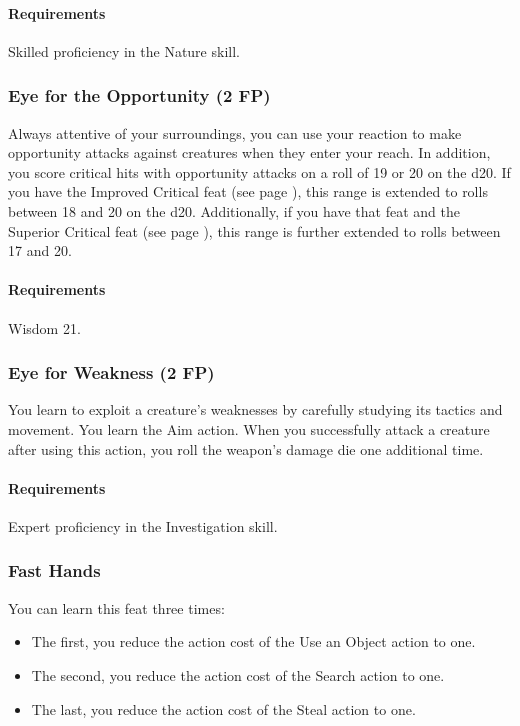     \paragraph{Requirements} Skilled proficiency in the Nature skill.
\subsubsection{Eye for the Opportunity (2 FP)} \label{feat::eyefortheopportunity}
    Always attentive of your surroundings, you can use your reaction to make opportunity attacks against creatures when they enter your reach.
    In addition, you score critical hits with opportunity attacks on a roll of 19 or 20 on the d20.
    If you have the Improved Critical feat (see page \pageref{feat::improvedcritical}), this range is extended to rolls between 18 and 20 on the d20.
    Additionally, if you have that feat and the Superior Critical feat (see page \pageref{feat::superiorcritical}), this range is further extended to rolls between 17 and 20.
    \paragraph{Requirements} Wisdom 21.
\subsubsection{Eye for Weakness (2 FP)} \label{feat::eyeforweakness}
    You learn to exploit a creature's weaknesses by carefully studying its tactics and movement.
    You learn the Aim action.
    When you successfully attack a creature after using this action, you roll the weapon's damage die one additional time.
    \paragraph{Requirements} Expert proficiency in the Investigation skill.
\subsubsection{Fast Hands} \label{feat::fasthands}
    You can learn this feat three times:
    \begin{itemize}
        \item The first, you reduce the action cost of the Use an Object action to one.
        \item The second, you reduce the action cost of the Search action to one.
        \item The last, you reduce the action cost of the Steal action to one.
    \end{itemize}
